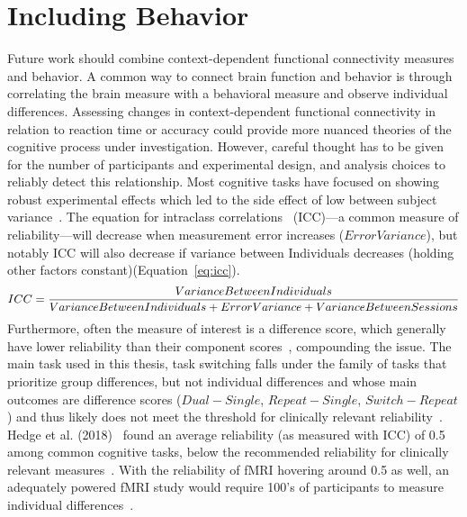 \documentclass[phd,figures,tables,ackpage,abstractpage,publicabstractpage]{uithesis}
\begin{document}
\section{Including Behavior}

Future work should combine context-dependent functional connectivity measures and behavior.
A common way to connect brain function and behavior is through correlating the brain measure
with a behavioral measure and observe individual differences.
Assessing changes in context-dependent functional connectivity in relation to reaction time
or accuracy could provide more nuanced theories of the cognitive process under investigation.
However, careful thought has to be given for the number of participants and experimental design,
and analysis choices to reliably detect this relationship.
Most cognitive tasks have focused on showing robust experimental effects which led to the side effect
of low between subject variance~\cite{Hedge2018}.
The equation for intraclass correlations~\cite{Stanish1983}
(ICC)---a common measure of reliability---will
decrease when measurement error increases ($ErrorVariance$),
but notably ICC will also decrease if variance between Individuals
decreases (holding other factors constant)(Equation~\ref{eq:icc}).
\begin{equation}
  \fontsize{10}{12}\selectfont
  ICC = \frac{Variance Between Individuals}{Variance Between Individuals + Error Variance + Variance Between Sessions}
  \label{eq:icc}
\end{equation}
Furthermore, often the measure of interest is a difference score, which
generally have lower reliability than their component scores~\cite{Edwards2001},
compounding the issue.
The main task used in this thesis, task switching falls under the family of tasks that prioritize
group differences, but not individual differences and whose main outcomes are
difference scores ($Dual - Single$, $Repeat - Single$, $Switch - Repeat$) and thus
likely does not meet the threshold for clinically relevant reliability~\cite{Barch2008}.
Hedge et al. (2018)~\cite{Hedge2018} found an average reliability (as measured with ICC)
of 0.5 among common cognitive tasks, below the recommended reliability for clinically relevant measures~\cite{Barch2008}.
With the reliability of fMRI hovering around 0.5 as well, an adequately powered fMRI study
would require 100's of participants to measure individual differences~\cite{Bennett2010,Hedge2018}.
\end{document}
